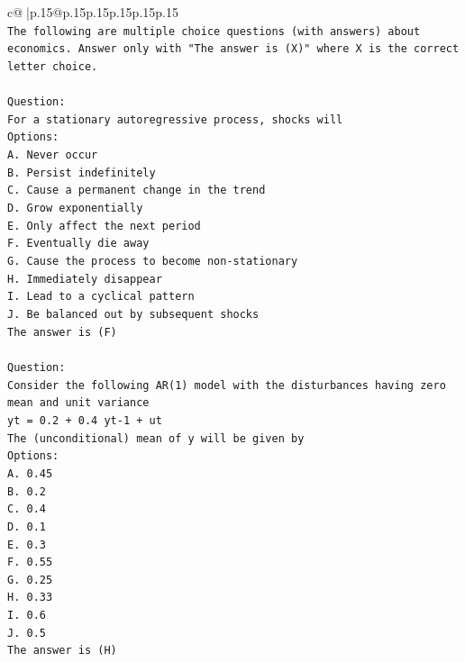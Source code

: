 \documentclass{article}
\begin{document}
{\begin{supertabular}{c@{$\;$}|p{.15\linewidth}@{}p{.15\linewidth}p{.15\linewidth}p{.15\linewidth}p{.15\linewidth}p{.15\linewidth}}
{{{\\ 
\texttt{The following are multiple choice questions (with answers) about economics. Answer only with "The answer is (X)" where X is the correct letter choice.} \\
\\ 
\texttt{Question:} \\
\texttt{For a stationary autoregressive process, shocks will} \\
\texttt{Options:} \\
\texttt{A. Never occur} \\
\texttt{B. Persist indefinitely} \\
\texttt{C. Cause a permanent change in the trend} \\
\texttt{D. Grow exponentially} \\
\texttt{E. Only affect the next period} \\
\texttt{F. Eventually die away} \\
\texttt{G. Cause the process to become non{-}stationary} \\
\texttt{H. Immediately disappear} \\
\texttt{I. Lead to a cyclical pattern} \\
\texttt{J. Be balanced out by subsequent shocks} \\
\texttt{The answer is (F)} \\
\\ 
\texttt{Question:} \\
\texttt{Consider the following AR(1) model with the disturbances having zero mean and unit variance} \\
\texttt{yt = 0.2 + 0.4 yt{-}1 + ut} \\
\texttt{The (unconditional) mean of y will be given by} \\
\texttt{Options:} \\
\texttt{A. 0.45} \\
\texttt{B. 0.2} \\
\texttt{C. 0.4} \\
\texttt{D. 0.1} \\
\texttt{E. 0.3} \\
\texttt{F. 0.55} \\
\texttt{G. 0.25} \\
\texttt{H. 0.33} \\
\texttt{I. 0.6} \\
\texttt{J. 0.5} \\
\texttt{The answer is (H)} \\
\\ 
}}}
\end{supertabular}}
\end{document}
